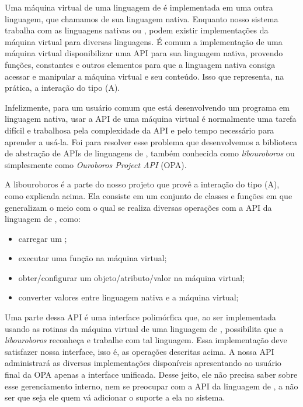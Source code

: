     Uma máquina virtual de uma linguagem de \script{} é implementada em uma outra
    linguagem, que chamamos de sua linguagem nativa. Enquanto nosso sistema trabalha
    com as linguagens nativas \C{} ou \CXX{}, podem existir implementações da máquina
    virtual para diversas linguagens. É comum a implementação de uma máquina virtual
    disponibilizar uma API para sua linguagem nativa, provendo funções, constantes
    e outros elementos para que a linguagem nativa consiga acessar e manipular a
    máquina virtual e seu conteúdo. Isso que representa, na prática, a interação do
    tipo (A).

    Infelizmente, para um usuário comum que está desenvolvendo um programa em
    linguagem nativa, usar a API de uma máquina virtual é normalmente uma tarefa
    difícil e trabalhosa pela complexidade da API e pelo tempo necessário para
    aprender a usá-la. Foi para resolver esse problema que desenvolvemos a
    biblioteca de abstração de APIs de linguagens de \script{}, também conhecida
    como \textit{libouroboros} ou simplesmente como \emph{Ouroboros Project API}
    (OPA).
    
    A libouroboros é a parte do nosso projeto que provê a interação do tipo (A),
    como explicada acima. Ela consiste em um conjunto de classes e funções em 
    \CXX{} que generalizam o meio com o qual se realiza diversas operações com 
    a API da linguagem de \script{}, como:
    \begin{itemize}
      \item carregar um \script{};
      \item executar uma função na máquina virtual;
      \item obter/configurar um objeto/atributo/valor na máquina virtual;
      \item converter valores entre linguagem nativa e a máquina virtual;
    \end{itemize}
    Uma parte dessa API é uma interface polimórfica que, ao ser implementada usando
    as rotinas da máquina virtual de uma linguagem de \script{}, possibilita que
    a \emph{libouroboros} reconheça e trabalhe com tal linguagem. Essa
    implementação deve satisfazer nossa interface, isso é, as operações
    descritas acima. A nossa API administrará as diversas implementações
    disponíveis apresentando ao usuário final da OPA apenas a interface
    unificada. Desse jeito, ele não precisa saber sobre esse gerenciamento
    interno, nem se preocupar com a API da linguagem de \script{}, a não ser que
    seja ele quem vá adicionar o suporte a ela no sistema.

